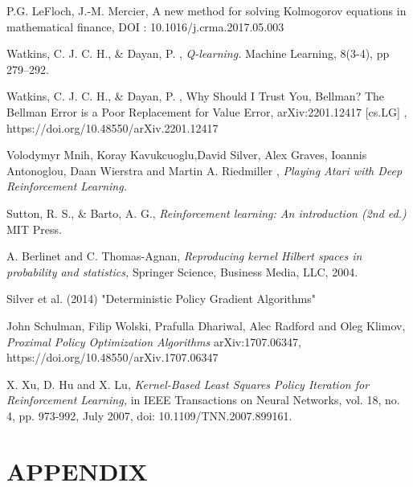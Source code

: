 \documentclass[
]{article}
\numberwithin{equation}{section}
\begin{document}
\begin{thebibliography}{1}
{\sc P.G. LeFloch, J.-M. Mercier, }
A new method for solving Kolmogorov equations in mathematical finance,
DOI : 10.1016/j.crma.2017.05.003

{\sc Watkins, C. J. C. H., \& Dayan, P. }, 
{\sl Q-learning.}
Machine Learning, 8(3-4), pp 279–292.

{\sc Watkins, C. J. C. H., \& Dayan, P. }, 
Why Should I Trust You, Bellman? The Bellman Error is a Poor Replacement for Value Error, arXiv:2201.12417 [cs.LG]
, https://doi.org/10.48550/arXiv.2201.12417


{\sc Volodymyr Mnih, Koray Kavukcuoglu,David Silver, Alex Graves, Ioannis Antonoglou, Daan Wierstra and Martin A. Riedmiller }, 
{\sl Playing Atari with Deep Reinforcement Learning.} 

{\sc Sutton, R. S., \& Barto, A. G.}, 
{\sl Reinforcement learning: An introduction (2nd ed.)}
MIT Press.

{\sc A. Berlinet and C. Thomas-Agnan,}
{\it Reproducing kernel Hilbert spaces in probability and statistics,}
Springer Science, Business Media, LLC, 2004.

{
Silver et al. (2014) "Deterministic Policy Gradient Algorithms"
}

{\sc John Schulman, Filip Wolski, Prafulla Dhariwal, Alec Radford and Oleg Klimov}, 
{\sl Proximal Policy Optimization Algorithms}
 arXiv:1707.06347, 
https://doi.org/10.48550/arXiv.1707.06347



{\sc X. Xu, D. Hu and X. Lu,}
{\it Kernel-Based Least Squares Policy Iteration for Reinforcement Learning,}
in IEEE Transactions on Neural Networks, vol. 18, no. 4, pp. 973-992, July 2007, doi: 10.1109/TNN.2007.899161. 

\end{thebibliography}

\hypertarget{APPENDIX}{%
\section{APPENDIX}\label{APPENDIX}}
\end{document}

